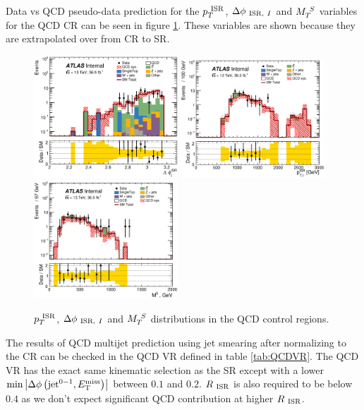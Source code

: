 \indent Data vs QCD pseudo-data prediction for the $p_{T}^{~\mathrm{ISR}}$, $\Delta\phi_{~\mathrm{ISR},~I}$ and $M_{T}^{~S}$ variables for the QCD CR can be seen in figure \ref{fig:QCD:CR}.  These variables are shown because they are extrapolated over from CR to SR. \\

\begin{figure}[!htbp]
\begin{center}
\includegraphics[width=0.48\textwidth]{figures/QCDJetSmearing/CRQC/dphiISRI_36500.eps}
\includegraphics[width=0.48\textwidth]{figures/QCDJetSmearing/CRQC/PTISR_36500}
\includegraphics[width=0.48\textwidth]{figures/QCDJetSmearing/CRQC/MV_36500}
\caption{$p_{T}^{~\mathrm{ISR}}$, $\Delta\phi_{~\mathrm{ISR},~I}$ and $M_{T}^{~S}$ distributions in the QCD control regions.}
\label{fig:QCD:CR}
\end{center}
\end{figure}

\indent The results of QCD multijet prediction using jet smearing after normalizing to the CR can be checked in the QCD VR defined in table \ref{tab:QCDVR}.   The QCD VR has the exact same kinematic selection as the SR except with a lower $\min \left|\Delta\phi\left(\mathrm{jet}^{0-1},E_{\mathrm{T}}^{\mathrm{miss}}\right)\right|$ between $0.1$ and $0.2$.  $R_{~\mathrm{ISR}}$ is also required to be below $0.4$ as we don't expect significant QCD contribution at higher $R_{~\mathrm{ISR}}$.  \\

